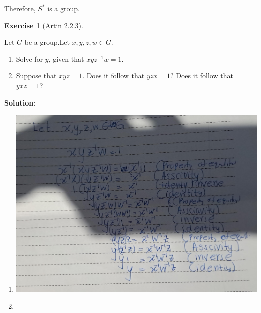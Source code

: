 \documentclass[
]{book}
\providecommand{\tightlist}{%
  \setlength{\itemsep}{0pt}\setlength{\parskip}{0pt}}
\theoremstyle{definition}
\theoremstyle{definition}
\theoremstyle{definition}
\newtheorem{exercise}{Exercise}[chapter]
\theoremstyle{definition}
\theoremstyle{remark}
\begin{document}
Therefore, \(S^*\) is a group.

\begin{exercise}[Artin 2.2.3]
\protect\hypertarget{exr:unnamed-chunk-72}{}\label{exr:unnamed-chunk-72}

Let \(G\) be a group.Let \(x, y, z,w \in G\).

\begin{enumerate}
\def\labelenumi{(\alph{enumi})}
\tightlist
\item
  Solve for \(y\), given that \(xyz^{-1}w = 1\).
\item
  Suppose that \(xyz = 1\). Does it follow that \(yzx = 1\)? Does it follow that \(yxz = 1\)?
\end{enumerate}

\end{exercise}

\textbf{Solution}:

\begin{enumerate}
\def\labelenumi{\alph{enumi}.}
\tightlist
\item
  \hfill\break
  \includegraphics{figures/ch_2/fig17.jpg}
\item
  \hfill\break
\end{enumerate}
\end{document}
